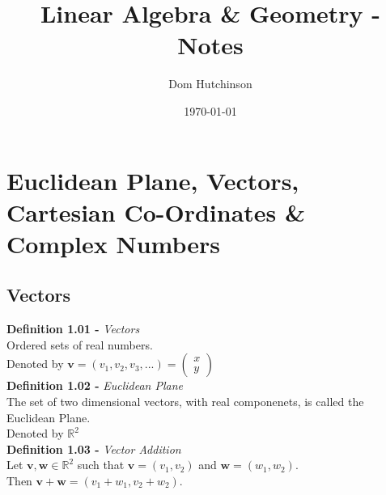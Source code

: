 \documentclass[11pt,a4paper]{article}
\begin{document}
\pagestyle{fancy}
\setlength\parindent{0pt}
\allowdisplaybreaks

\renewcommand{\headrulewidth}{0pt}
\newcommand{\vect}[1]{\boldsymbol{#1}}
\newcommand{\subtitle}[2]{\textbf{#1}\textit{#2} \\}
\newcommand{\dotprod}[0]{\boldsymbol{\cdot}}
\newcommand{\real}[0]{\mathbb{R}}
\newcommand{\nat}[0]{\mathbb{N}}
\newcommand{\field}[0]{\mathbb{F}}
\newcommand{\vectorspace}[0]{\mathbb{V}}
\newcommand{\basis}[0]{\mathbb{B}}

\title{Linear Algebra \& Geometry - Notes}
\author{Dom Hutchinson}
\date{\today}
\maketitle

\fancyhead[R]{\today}

\tableofcontents

\newpage

\section{Euclidean Plane, Vectors, Cartesian Co-Ordinates \& Complex Numbers}

\subsection{Vectors}

\subtitle{Definition 1.01 - }{Vectors}
Ordered sets of real numbers. \\
Denoted by $\vect{v} = (v_1, v_2, v_3,...) = \begin{pmatrix} x \\ y \end{pmatrix}$ \\

\subtitle{Definition 1.02 - }{Euclidean Plane}
The set of two dimensional vectors, with real componenets, is called the Euclidean Plane. \\
Denoted by $\real^2$ \\

\subtitle{Definition 1.03 - }{Vector Addition}
Let $\vect{v}, \vect{w} \in \real^2$ such that $\vect{v} = (v_1,v_2)$ and $\vect{w} = (w_1,w_2)$. \\
Then $\vect{v} + \vect{w} = (v_1 + w_1, v_2 + w_2)$. \\
\end{document}
